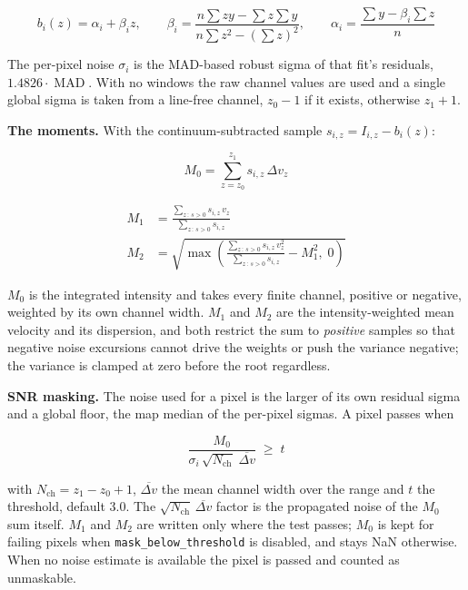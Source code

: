 \documentclass[11pt,a4paper]{article}
\newcommand{\code}[1]{\texttt{\small #1}}
\begin{document}
    \begin{equation}
        b_i(z) = \alpha_i + \beta_i z, \qquad
        \beta_i = \frac{n \sum z y - \sum z \sum y}{n \sum z^2 - \left(\sum z\right)^2}, \qquad
        \alpha_i = \frac{\sum y - \beta_i \sum z}{n}
    \end{equation}

    The per-pixel noise $\sigma_i$ is the MAD-based robust sigma of that fit's residuals, $1.4826 \cdot \operatorname{MAD}$. With no windows the raw channel values are used and a single global sigma is taken from a line-free channel, $z_0 - 1$ if it exists, otherwise $z_1 + 1$.

    \textbf{The moments.} With the continuum-subtracted sample $s_{i,z} = I_{i,z} - b_i(z)$:

    \begin{equation}
        \boxed{
            M_0 = \sum_{z=z_0}^{z_1} s_{i,z} \, \Delta v_z
        }
    \end{equation}

    \begin{align}
        M_1 &= \frac{\sum_{z \,:\, s > 0} s_{i,z} \, v_z}{\sum_{z \,:\, s > 0} s_{i,z}} \\[8pt]
        M_2 &= \sqrt{ \max\!\left( \frac{\sum_{z \,:\, s > 0} s_{i,z} \, v_z^2}{\sum_{z \,:\, s > 0} s_{i,z}} - M_1^2 ,\; 0 \right) }
    \end{align}

    $M_0$ is the integrated intensity and takes every finite channel, positive or negative, weighted by its own channel width. $M_1$ and $M_2$ are the intensity-weighted mean velocity and its dispersion, and both restrict the sum to \emph{positive} samples so that negative noise excursions cannot drive the weights or push the variance negative; the variance is clamped at zero before the root regardless.

    \textbf{SNR masking.} The noise used for a pixel is the larger of its own residual sigma and a global floor, the map median of the per-pixel sigmas. A pixel passes when

    \begin{equation}
        \boxed{
            \frac{M_0}{\sigma_i \, \sqrt{N_{\text{ch}}} \; \overline{\Delta v}} \;\ge\; t
        }
    \end{equation}

    with $N_{\text{ch}} = z_1 - z_0 + 1$, $\overline{\Delta v}$ the mean channel width over the range and $t$ the threshold, default $3.0$. The $\sqrt{N_{\text{ch}}} \, \overline{\Delta v}$ factor is the propagated noise of the $M_0$ sum itself. $M_1$ and $M_2$ are written only where the test passes; $M_0$ is kept for failing pixels when \code{mask\_below\_threshold} is disabled, and stays NaN otherwise. When no noise estimate is available the pixel is passed and counted as unmaskable.
\end{document}
